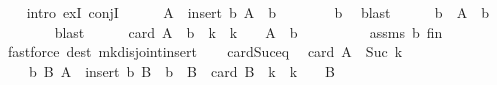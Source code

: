 \begin{isabellebody}
\ \ \isamarkupfalse%
\ {\isacharparenleft}{\kern0pt}intro\ exI\ conjI{\isacharparenright}{\kern0pt}\isanewline
\ \ \ \ \isamarkupfalse%
\ {\isachardoublequoteopen}A\ {\isacharequal}{\kern0pt}\ insert\ b\ {\isacharparenleft}{\kern0pt}A\ {\isacharminus}{\kern0pt}\ {\isacharbraceleft}{\kern0pt}b{\isacharbraceright}{\kern0pt}{\isacharparenright}{\kern0pt}{\isachardoublequoteclose}\isanewline
\ \ \ \ \ \ \isamarkupfalse%
\ b\ \isamarkupfalse%
\ blast\isanewline
\ \ \ \ \isamarkupfalse%
\ {\isachardoublequoteopen}b\ {\isasymnotin}\ A\ {\isacharminus}{\kern0pt}\ {\isacharbraceleft}{\kern0pt}b{\isacharbraceright}{\kern0pt}{\isachardoublequoteclose}\isanewline
\ \ \ \ \ \ \isamarkupfalse%
\ blast\isanewline
\ \ \ \ \isamarkupfalse%
\ {\isachardoublequoteopen}card\ {\isacharparenleft}{\kern0pt}A\ {\isacharminus}{\kern0pt}\ {\isacharbraceleft}{\kern0pt}b{\isacharbraceright}{\kern0pt}{\isacharparenright}{\kern0pt}\ {\isacharequal}{\kern0pt}\ k{\isachardoublequoteclose}\ \ {\isachardoublequoteopen}k\ {\isacharequal}{\kern0pt}\ {}\ {\isasymlongrightarrow}\ A\ {\isacharminus}{\kern0pt}\ {\isacharbraceleft}{\kern0pt}b{\isacharbraceright}{\kern0pt}\ {\isacharequal}{\kern0pt}\ {\isacharbraceleft}{\kern0pt}{\isacharbraceright}{\kern0pt}{\isachardoublequoteclose}\isanewline
\ \ \ \ \ \ \isamarkupfalse%
\ assms\ b\ fin\ \isamarkupfalse%
\ {\isacharparenleft}{\kern0pt}fastforce\ dest{\isacharcolon}{\kern0pt}\ mk{\isacharunderscore}{\kern0pt}disjoint{\isacharunderscore}{\kern0pt}insert{\isacharparenright}{\kern0pt}{\isacharplus}{\kern0pt}\isanewline
\ \ \isamarkupfalse%
\isanewline
{}\isamarkupfalse%
%
\endisatagproof
{\isafoldproof}%
%
\isadelimproof
\isanewline
%
\endisadelimproof
\isanewline
{}\isamarkupfalse%
\ card{\isacharunderscore}{\kern0pt}Suc{\isacharunderscore}{\kern0pt}eq{\isacharcolon}{\kern0pt}\isanewline
\ \ {\isachardoublequoteopen}card\ A\ {\isacharequal}{\kern0pt}\ Suc\ k\ {\isasymlongleftrightarrow}\isanewline
\ \ \ \ {\isacharparenleft}{\kern0pt}{\isasymexists}b\ B{\isachardot}{\kern0pt}\ A\ {\isacharequal}{\kern0pt}\ insert\ b\ B\ {\isasymand}\ b\ {\isasymnotin}\ B\ {\isasymand}\ card\ B\ {\isacharequal}{\kern0pt}\ k\ {\isasymand}\ {\isacharparenleft}{\kern0pt}k\ {\isacharequal}{\kern0pt}\ {}\ {\isasymlongrightarrow}\ B\ {\isacharequal}{\kern0pt}\ {\isacharbraceleft}{\kern0pt}{\isacharbraceright}{\kern0pt}{\isacharparenright}{\kern0pt}{\isacharparenright}{\kern0pt}{\isachardoublequoteclose}\isanewline

\end{isabellebody}
